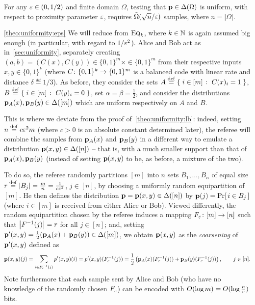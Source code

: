 \begin{theorem}\label{theo:uniformity:eps}
For any $\eps\in(0,1/2)$ and finite domain $\Omega$, testing that $\p\in \distribs{\Omega}$ is uniform, with respect to proximity parameter $\eps$, requires $\tildeOmega{\sqrt{n}/\eps}$ samples, where $n = |\Omega|$.
\end{theorem}
\begin{proofof}{\cref{theo:uniformity:eps}}
We will reduce from $\EQ[k]$, where $k\in\N$ is again assumed big enough (in particular, with regard to $1/\eps^2$). Alice and Bob act as in~\cref{sec:uniformity}, separately creating $(a,b)=(C(x),C(y))\in\{0,1\}^m\times \in\{0,1\}^m$ from their respective inputs $x,y\in \{0,1\}^k$ (where $C\colon \bitset^k \to \bitset^m$ is a balanced code with linear rate and distance $\delta\eqdef 1/3$). As before, they consider the sets $A\eqdef \setOfSuchThat{ i\in[m] }{ C(x)_i=1 }$, $B\eqdef \setOfSuchThat{ i\in[m] }{ C(y)_i=0 }$, set $\alpha=\beta=\frac{1}{2}$, and consider the distributions $\p_A(x),\p_B(y)\in\distribs{[m]}$ which are uniform respectively on $A$ and $B$.

This is where we deviate from the proof of~\cref{theo:uniformity:lb}: indeed, setting $n\eqdef c \eps^2 m$ (where $c>0$ is an absolute constant determined later), the referee will combine the samples from $\p_A(x)$ and $\p_B(y)$ in a different way to emulate a distribution $\p(x,y)\in\distribs{[n]}$ -- that is, with a much smaller support than that of $\p_A(x),\p_B(y)$ (instead of setting $\p(x,y)$ to be, as before, a mixture of the two).

To do so, the referee randomly partitions $[m]$ into $n$ sets $B_1,\dots, B_n$ of equal size $r\eqdef \abs{B_j} = \frac{m}{n} = \frac{1}{c\eps^2}$, $j\in[n]$, by choosing a uniformly random equipartition of $[m]$. He then defines the distribution $\p=\p(x,y)\in\distribs{[n]}$ by $\p(j) = \probaOf{ i \in B_j }$ (where $i\in[m]$ is received from either Alice or Bob). Viewed differently, the random equipartition chosen by the referee induces a mapping $F_\eps\colon [m] \to [n]$ such that $\abs{F^{-1}(j)} = r$ for all $j\in[n]$; and, setting $\p'(x,y) = \frac{1}{2}(\p_A(x)+\p_B(y))\in\distribs{[m]}$, we obtain $\p(x,y)$ as the \emph{coarsening} of $\p'(x,y)$ defined as
\[
    \p(x,y)(j) = \sum_{i\in F_\eps^{-1}(j)} p'(x,y)(i) = p'(x,y)( F_\eps^{-1}(j) ) = \frac{1}{2}\left( \p_A(x)( F_\eps^{-1}(j) ) +\p_B(y)( F_\eps^{-1}(j) ) \right), \qquad j\in [n].
\]
Note furthermore that each sample sent by Alice and Bob (who have no knowledge of the randomly chosen $F_\eps$) can be encoded with $O(\log m) = O(\log\frac{n}{\eps})$ bits.


\end{proofof}
